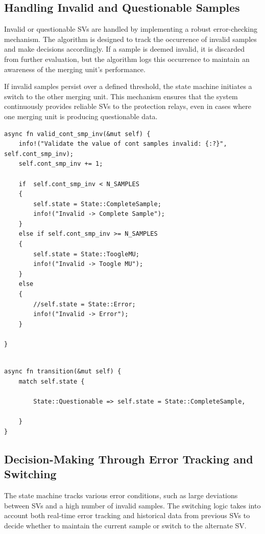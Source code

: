 \pagebreak

\subsection{Handling Invalid and Questionable Samples}
Invalid or questionable SVs are handled by implementing a robust error-checking mechanism. The algorithm is designed to track the occurrence of invalid samples and make decisions accordingly. If a sample is deemed invalid, it is discarded from further evaluation, but the algorithm logs this occurrence to maintain an awareness of the merging unit's performance.

If invalid samples persist over a defined threshold, the state machine initiates a switch to the other merging unit. This mechanism ensures that the system continuously provides reliable SVs to the protection relays, even in cases where one merging unit is producing questionable data.

\begin{lstlisting}[caption={This function handles invalid samples by comparing their value to N\_SAMPLES. If less, it increments a counter and transitions to CompleteSample, if greater or equal, it moves to ToggleMU. This must happen before reaching CompleteCycle, where variables are reset.}]
async fn valid_cont_smp_inv(&mut self) {
	info!("Validate the value of cont samples invalid: {:?}", self.cont_smp_inv);
	self.cont_smp_inv += 1;
	
	if  self.cont_smp_inv < N_SAMPLES
	{
		self.state = State::CompleteSample;
		info!("Invalid -> Complete Sample");
	}
	else if self.cont_smp_inv >= N_SAMPLES 
	{
		self.state = State::ToogleMU;
		info!("Invalid -> Toogle MU");
	}
	else 
	{
		//self.state = State::Error;
		info!("Invalid -> Error");    
	}      
	
}
\end{lstlisting}

\begin{lstlisting}[caption={This function handles questionable samples by simply waiting for the next tick to transition to the CompleteSample state.}]

async fn transition(&mut self) {
	match self.state {
		
		State::Questionable => self.state = State::CompleteSample,

	}
}
\end{lstlisting}

\subsection{Decision-Making Through Error Tracking and Switching}
The state machine tracks various error conditions, such as large deviations between SVs and a high number of invalid samples. The switching logic takes into account both real-time error tracking and historical data from previous SVs to decide whether to maintain the current sample or switch to the alternate SV.

